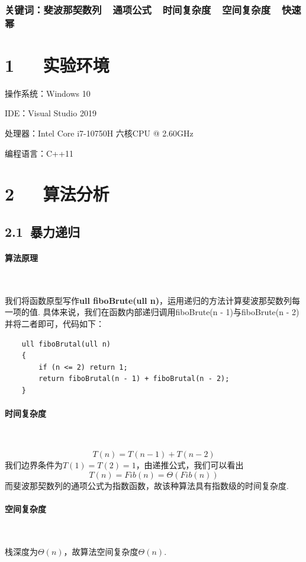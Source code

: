 \documentclass[UTF8]{ctexart}
\begin{document}
\subsubsection*{关键词：斐波那契数列\ \ 通项公式\ \ 时间复杂度\ \ 空间复杂度\ \ 快速幂\vspace{1.5em}}

\section*{1\ \ \ 实验环境}
操作系统：Windows 10\par
IDE：Visual Studio 2019\par
处理器：Intel Core i7-10750H 六核CPU @ 2.60GHz\par
编程语言：C++11

\section*{2\ \ \ 算法分析}
\subsection*{2.1\ 暴力递归}
\paragraph{算法原理}\ \par
我们将函数原型写作\textbf{ull fiboBrute(ull n)}，运用递归的方法计算斐波那契数列每一项的值. 具体来说，我们在函数内部递归调用fiboBrute(n - 1)与fiboBrute(n - 2)并将二者即可，代码如下：

\begin{lstlisting}
    ull fiboBrutal(ull n)
    {
        if (n <= 2) return 1;
        return fiboBrutal(n - 1) + fiboBrutal(n - 2);
    }
\end{lstlisting}

\paragraph{时间复杂度}\ \par
\begin{equation}T(n)=T(n-1)+T(n-2)\end{equation}
我们边界条件为$T(1)=T(2)=1$，由递推公式，我们可以看出
\begin{equation}T(n)=Fib(n)=\Theta(Fib(n))\end{equation}
而斐波那契数列的通项公式为指数函数，故该种算法具有指数级的时间复杂度.
\paragraph{空间复杂度}\ \par
栈深度为$\Theta(n)$，故算法空间复杂度$\Theta(n)$.
\end{document}
